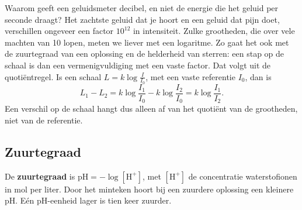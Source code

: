 Waarom geeft een geluidsmeter decibel, en niet de energie die het geluid per seconde draagt? Het zachtste geluid dat je hoort en een geluid dat pijn doet, verschillen ongeveer een factor $10^{12}$ in intensiteit. Zulke grootheden, die over vele machten van 10 lopen, meten we liever met een logaritme. Zo gaat het ook met de zuurtegraad van een oplossing en de helderheid van sterren: een stap op de schaal is dan een vermenigvuldiging met een vaste factor. Dat volgt uit de quotiëntregel. Is een schaal $L = k \log \frac{I}{I_0}$, met een vaste referentie $I_0$, dan is
\[L_1 - L_2 = k \log \frac{I_1}{I_0} - k \log \frac{I_2}{I_0} = k \log \frac{I_1}{I_2} .\]
Een verschil op de schaal hangt dus alleen af van het quotiënt van de grootheden, niet van de referentie.

\subsection{Zuurtegraad}

De \textbf{zuurtegraad} is $\mathrm{pH} = -\log [\mathrm{H}^+]$, met $[\mathrm{H}^+]$ de concentratie waterstofionen in mol per liter. Door het minteken hoort bij een zuurdere oplossing een kleinere pH. Eén pH-eenheid lager is tien keer zuurder.



